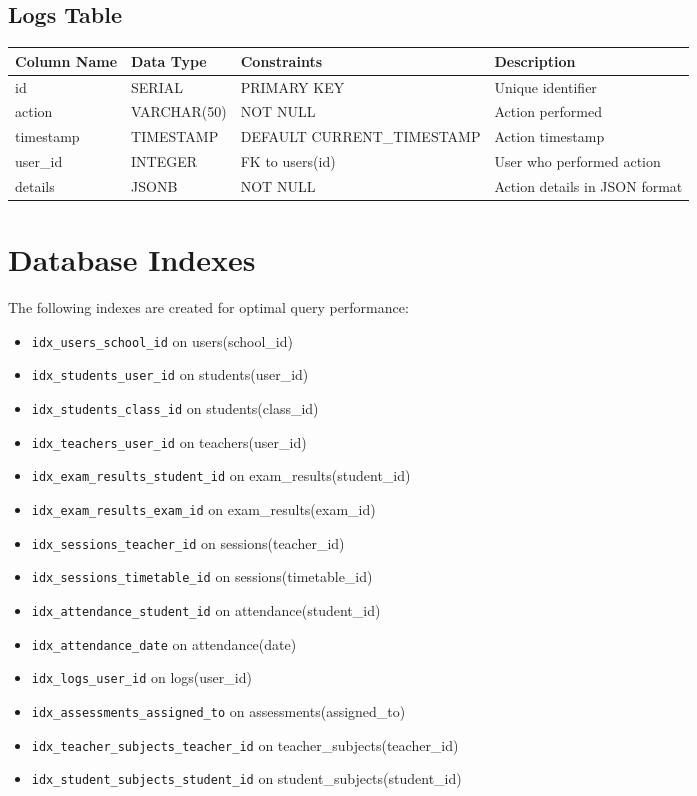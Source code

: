 \documentclass[11pt,a4paper]{article}
\begin{document}
\subsection{Logs Table}
\begin{longtable}{|p{3cm}|p{3cm}|p{2cm}|p{6cm}|}
\hline
\textbf{Column Name} & \textbf{Data Type} & \textbf{Constraints} & \textbf{Description} \\
\hline
\endhead
id & SERIAL & PRIMARY KEY & Unique identifier \\
\hline
action & VARCHAR(50) & NOT NULL & Action performed \\
\hline
timestamp & TIMESTAMP & DEFAULT CURRENT\_TIMESTAMP & Action timestamp \\
\hline
user\_id & INTEGER & FK to users(id) & User who performed action \\
\hline
details & JSONB & NOT NULL & Action details in JSON format \\
\hline
\end{longtable}

\section{Database Indexes}

The following indexes are created for optimal query performance:

\begin{itemize}
    \item \texttt{idx\_users\_school\_id} on users(school\_id)
    \item \texttt{idx\_students\_user\_id} on students(user\_id)
    \item \texttt{idx\_students\_class\_id} on students(class\_id)
    \item \texttt{idx\_teachers\_user\_id} on teachers(user\_id)
    \item \texttt{idx\_exam\_results\_student\_id} on exam\_results(student\_id)
    \item \texttt{idx\_exam\_results\_exam\_id} on exam\_results(exam\_id)
    \item \texttt{idx\_sessions\_teacher\_id} on sessions(teacher\_id)
    \item \texttt{idx\_sessions\_timetable\_id} on sessions(timetable\_id)
    \item \texttt{idx\_attendance\_student\_id} on attendance(student\_id)
    \item \texttt{idx\_attendance\_date} on attendance(date)
    \item \texttt{idx\_logs\_user\_id} on logs(user\_id)
    \item \texttt{idx\_assessments\_assigned\_to} on assessments(assigned\_to)
    \item \texttt{idx\_teacher\_subjects\_teacher\_id} on teacher\_subjects(teacher\_id)
    \item \texttt{idx\_student\_subjects\_student\_id} on student\_subjects(student\_id)
\end{itemize}
\end{document}
